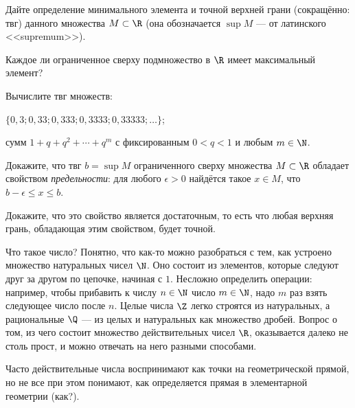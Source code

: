 \documentclass[a4paper, 12pt, num=2729, date=01.09.2020]{listok}
\begin{document}
\begin{problem}
    Дайте определение минимального элемента и точной верхней грани (сокращённо: твг) данного множества $M \subset \R$
    (она обозначается $\sup M$ --- от латинского <<supremum>>).
\end{problem}

\begin{problem}
    Каждое ли ограниченное сверху подмножество в $\R$ имеет максимальный элемент?
\end{problem}

\begin{problem}
    Вычислите твг множеств:
    \begin{probparts}
        \item $\{0{,}3; 0{,}33; 0{,}333; 0{,}3333 ; 0{,}33333 ; \ldots \}$;
        \item сумм $1 + q + q^2 + \cdots + q^m$ с фиксированным $0< q< 1$ и любым $m \in \N$.
    \end{probparts}
\end{problem}

\begin{problem}
\begin{probparts}
    \item Докажите, что твг $b = \sup M$ ограниченного сверху множества $M \subset \R$ обладает свойством \textit{предельности}:
        для любого $\epsilon > 0$ найдётся такое $x \in M$, что $b - \epsilon \le x \le b$.
    \item Докажите, что это свойство является достаточным, то есть что любая верхняя грань, обладающая этим свойством, будет точной.
\end{probparts}
\end{problem}

Что такое число? Понятно, что как-то можно разобраться с тем, как устроено множество натуральных чисел $\N$. Оно состоит из элементов, которые следуют друг за другом по цепочке, начиная с $1$. Несложно определить операции: например, чтобы прибавить к числу $n \in \N$ число $m \in \N$, надо $m$ раз взять следующее число после $n$. Целые числа $\Z$ легко строятся из натуральных, а рациональные $\Q$ --- из целых и натуральных как множество дробей. Вопрос о том, из чего состоит множество действительных чисел $\R$, оказывается далеко не столь прост, и можно отвечать на него разными способами. 

Часто действительные числа воспринимают как точки на геометрической прямой, но не все при этом понимают, как определяется прямая в элементарной геометрии (как?). 
\end{document}
